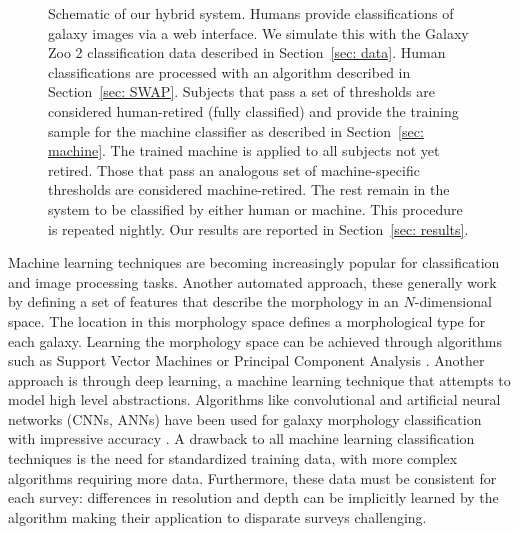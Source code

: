\documentclass[twocolumn,  trackchanges, ]{aastex6}%
\begin{document}
\begin{figure}[ht!]
\caption{Schematic of our hybrid system. Humans provide classifications of galaxy images via a web interface. We simulate this with the Galaxy Zoo 2 classification data described in Section~\ref{sec: data}. Human classifications are processed with an algorithm described in Section~\ref{sec: SWAP}. Subjects that pass a set of thresholds are considered human-retired (fully classified) and provide the training sample for the machine classifier as described in Section~\ref{sec: machine}. The trained machine is applied to all subjects not yet retired. Those that pass an analogous set of machine-specific thresholds are considered machine-retired. The rest remain in the system to be classified by either human or machine. This procedure is repeated  nightly. Our results are reported in Section~\ref{sec: results}.  \label{fig: schematic}}
\end{figure}

Machine learning techniques are becoming increasingly popular for classification and image processing tasks. Another automated approach, these generally work by defining a set of features that describe the morphology in an $N$-dimensional space. The location in this morphology space defines a morphological type for each galaxy. Learning the morphology space can be achieved through algorithms such as Support Vector Machines \citep{HuertasCompany2008} or Principal Component Analysis \citep{Watanabe1985, Scarlata2007}. Another approach is through deep learning, a machine learning technique that attempts to model high level abstractions. Algorithms like convolutional and artificial neural networks (CNNs, ANNs) have been used for galaxy morphology classification with impressive accuracy \citep{Ball2004, 
	Banerji2010, 
	Dieleman2015, 
	HuertasCompany2015}. 
A drawback to all machine learning classification techniques is the need for 
standardized training data, with more complex algorithms requiring more data. Furthermore, these data must be consistent for each survey: differences in resolution and depth can be implicitly learned by the algorithm making their application to disparate surveys challenging.  
\end{document}
